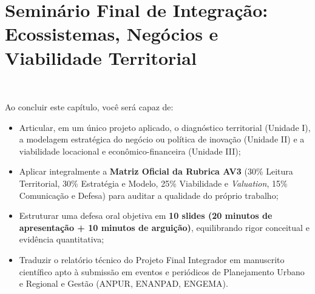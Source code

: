 

\chapter{Seminário Final de Integração: Ecossistemas, Negócios e Viabilidade Territorial}
\ \tagTerritorio

\begin{capObjetivos}
Ao concluir este capítulo, você será capaz de:
\begin{itemize}[leftmargin=1.4em, itemsep=2pt]
  \item Articular, em um único projeto aplicado, o diagnóstico territorial (Unidade I), a modelagem estratégica do negócio ou política de inovação (Unidade II) e a viabilidade locacional e econômico-financeira (Unidade III);
  \item Aplicar integralmente a \textbf{Matriz Oficial da Rubrica AV3} (30\% Leitura Territorial, 30\% Estratégia e Modelo, 25\% Viabilidade e \textit{Valuation}, 15\% Comunicação e Defesa) para auditar a qualidade do próprio trabalho;
  \item Estruturar uma defesa oral objetiva em \textbf{10 slides (20 minutos de apresentação + 10 minutos de arguição)}, equilibrando rigor conceitual e evidência quantitativa;
  \item Traduzir o relatório técnico do Projeto Final Integrador em manuscrito científico apto à submissão em eventos e periódicos de Planejamento Urbano e Regional e Gestão (ANPUR, ENANPAD, ENGEMA).
\end{itemize}
\end{capObjetivos}

